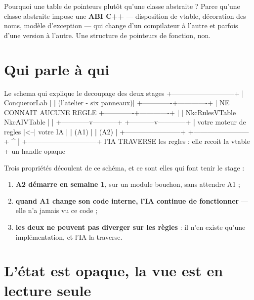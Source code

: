 Pourquoi une table de pointeurs plutôt qu'une classe abstraite ? Parce qu'une
classe abstraite impose une \textbf{ABI C++} — disposition de vtable, décoration
des noms, modèle d'exception — qui change d'un compilateur à l'autre et parfois
d'une version à l'autre. Une structure de pointeurs de fonction, non.

\section{Qui parle à qui}

\begin{nkcode}{Le schema qui explique le decoupage des deux stages}
                    +---------------------------+
                    |        ConquerorLab       |
                    | (l'atelier - six panneaux)|
                    +-------------+-------------+
                                  | NE CONNAIT AUCUNE REGLE
                    +-------------+-------------+
                    |                           |
          NkcRulesVTable                 NkcAIVTable
                    |                           |
       +------------v-----------+   +-----------v------------+
       | votre moteur de regles |<--|        votre IA        |
       |          (A1)          |   |          (A2)          |
       +------------------------+   +------------------------+
                  ^                              |
                  +------------------------------+
                     l'IA TRAVERSE les regles :
                     elle recoit la vtable + un handle opaque
\end{nkcode}

Trois propriétés découlent de ce schéma, et ce sont elles qui font tenir le
stage :

\begin{enumerate}
  \item \textbf{A2 démarre en semaine 1}, sur un module bouchon, sans attendre A1 ;
  \item \textbf{quand A1 change son code interne, l'IA continue de fonctionner} —
        elle n'a jamais vu ce code ;
  \item \textbf{les deux ne peuvent pas diverger sur les règles} : il n'en existe
        qu'une implémentation, et l'IA la traverse.
\end{enumerate}

\section{L'état est opaque, la vue est en lecture seule}

